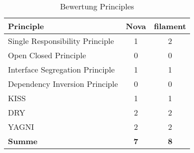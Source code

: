 \begin{table}[h!]
    \caption{Bewertung Principles}
    \label{tab:bewertung-principles}
    \centering
    \begin{tabular}{|l|c|c|}
        \hline
        \textbf{Principle}              & \textbf{Nova} & \textbf{filament} \\ \hline
        Single Responsibility Principle & 1             & 2                 \\ \hline
        Open Closed Principle           & 0             & 0                 \\ \hline
        Interface Segregation Principle & 1             & 1                 \\ \hline
        Dependency Inversion Principle  & 0             & 0                 \\ \hline
        KISS                            & 1             & 1                 \\ \hline
        DRY                             & 2             & 2                 \\ \hline
        YAGNI                           & 2             & 2                 \\ \hline
        \textbf{Summe}                  & \textbf{7}    & \textbf{8}        \\ \hline
    \end{tabular}
\end{table}

